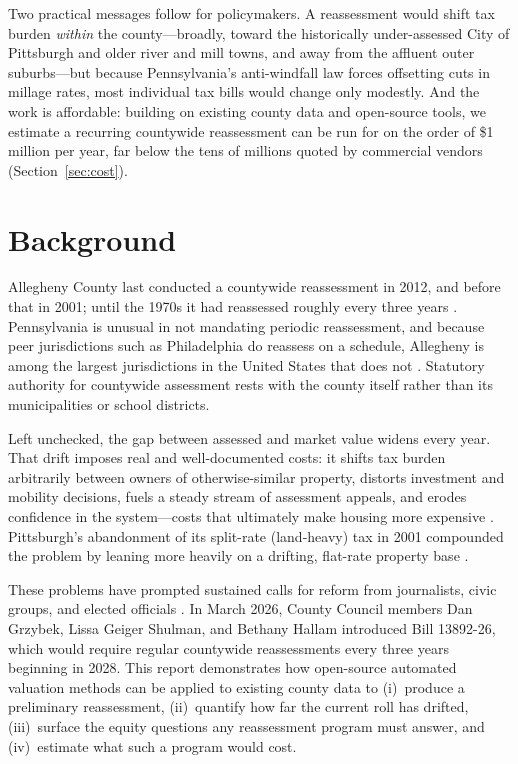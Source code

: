 \documentclass[11pt]{article}
\begin{document}
Two practical messages follow for policymakers. A reassessment would shift tax
burden \emph{within} the county---broadly, toward the historically under-assessed
City of Pittsburgh and older river and mill towns, and away from the affluent
outer suburbs---but because Pennsylvania's anti-windfall law forces offsetting cuts
in millage rates, most individual tax bills would change only modestly. And the
work is affordable: building on existing county data and open-source tools, we
estimate a recurring countywide reassessment can be run for on the order of
\$1\,million per year, far below the tens of millions quoted by commercial vendors
(Section~\ref{sec:cost}).

\section{Background}
Allegheny County last conducted a countywide reassessment in 2012, and before that
in 2001; until the 1970s it had reassessed roughly every three years
\citep{briem2022,hopton2018}. Pennsylvania is unusual in not mandating periodic
reassessment, and because peer jurisdictions such as Philadelphia do reassess on a
schedule, Allegheny is among the largest jurisdictions in the United States that
does not \citep{pa_cca,pa_sccal}. Statutory authority for countywide assessment
rests with the county itself rather than its municipalities or school districts.

Left unchecked, the gap between assessed and market value widens every year. That
drift imposes real and well-documented costs: it shifts tax burden arbitrarily
between owners of otherwise-similar property, distorts investment and mobility
decisions, fuels a steady stream of assessment appeals, and erodes confidence in
the system---costs that ultimately make housing more expensive \citep{horton2024}.
Pittsburgh's abandonment of its split-rate (land-heavy) tax in 2001 compounded the
problem by leaning more heavily on a drifting, flat-rate property base
\citep{hopton2018,hughes2006}.

These problems have prompted sustained calls for reform from journalists, civic
groups, and elected officials \citep{wesa2023,prohousing2024,pgh_council2025,postgazette2025}.
In March 2026, County Council members Dan Grzybek, Lissa Geiger Shulman, and
Bethany Hallam introduced Bill 13892-26, which would require regular countywide
reassessments every three years beginning in 2028. This report demonstrates how
open-source automated valuation methods can be applied to existing county data to
(i)~produce a preliminary reassessment, (ii)~quantify how far the current roll has
drifted, (iii)~surface the equity questions any reassessment program must answer,
and (iv)~estimate what such a program would cost.
\end{document}
